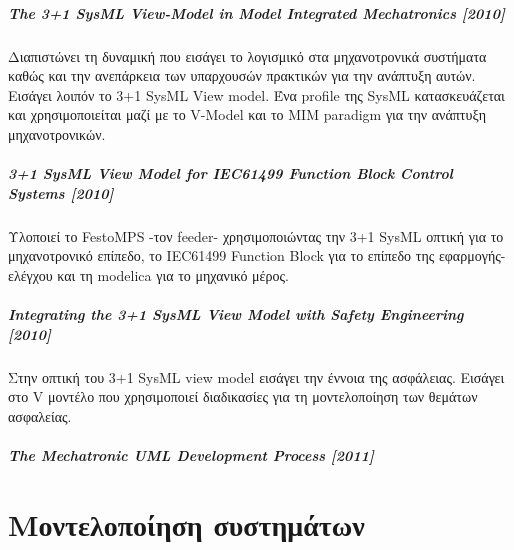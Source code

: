 \documentclass[a4paper,12pt,twoside]{report}
\begin{document}
{				\paragraph{The 3+1 SysML View-Model in Model Integrated Mechatronics [2010]}{Διαπιστώνει τη δυναμική που εισάγει το λογισμικό στα μηχανοτρονικά συστήματα καθώς και την ανεπάρκεια των υπαρχουσών πρακτικών για την ανάπτυξη αυτών. Εισάγει λοιπόν το 3+1 SysML View model. Ένα profile της SysML κατασκευάζεται και χρησιμοποιείται μαζί με το V-Model και το MIM paradigm για την ανάπτυξη μηχανοτρονικών. \cite{The3+1SysmlView-ModelInMIM:Thramboulidis2010}
				}
				
				\paragraph{3+1 SysML View Model for IEC61499 Function
Block Control Systems [2010]}{ Υλοποιεί το FestoMPS -τον feeder- χρησιμοποιώντας την 3+1 SysML οπτική για το μηχανοτρονικό επίπεδο, το IEC61499 Function Block για το επίπεδο της εφαρμογής-ελέγχου και τη modelica για το μηχανικό μέρος. \cite{3+1SysmlViewModelForIEC61499FBContolSystems:Thramboulidis2010}
				}
				
				\paragraph{Integrating the 3+1 SysML View Model
with Safety Engineering [2010]}{Στην οπτική του 3+1 SysML view model εισάγει την έννοια της ασφάλειας. Εισάγει στο V μοντέλο που χρησιμοποιεί διαδικασίες για τη μοντελοποίηση των θεμάτων ασφαλείας. \cite{IntegratingThe3+1SysnlViewModelWithSafetyEngineering:Thramboulidis2010}
				}
				
				\paragraph{The Mechatronic UML Development Process [2011] }{
				}
				
				
				
				
	\chapter{Μοντελοποίηση συστημάτων}
		\label{κεφ.:Μοντελοποίηση συστημάτων}

}
\end{document}
